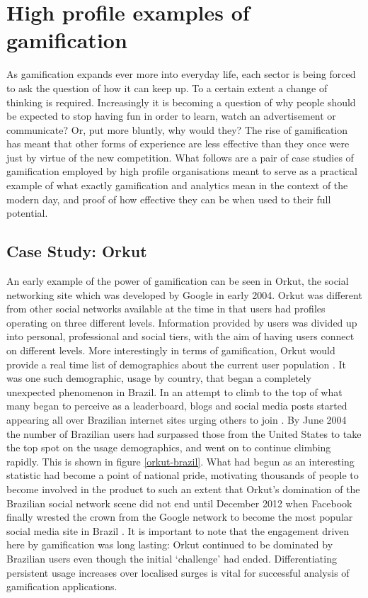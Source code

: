 \documentclass[12pt,a4paper,twoside]{report}
\begin{document}
\section{High profile examples of gamification}
As gamification expands ever more into everyday life, each sector is being forced to ask the question of how it can keep up. To a certain extent a change of thinking is required. Increasingly it is becoming a question of why people should be expected to stop having fun in order to learn, watch an advertisement or communicate? \cite{zichermann2010game} Or, put more bluntly, why would they? The rise of gamification has meant that other forms of experience are less effective than they once were just by virtue of the new competition. What follows are a pair of case studies of gamification employed by high profile organisations meant to serve as a practical example of what exactly gamification and analytics mean in the context of the modern day, and proof of how effective they can be when used to their full potential.

\subsection{Case Study: Orkut}

An early example of the power of gamification can be seen in Orkut, the social networking site which was developed by Google in early 2004. Orkut was different from other social networks available at the time in that users had profiles operating on three different levels. Information provided by users was divided up into personal, professional and social tiers, with the aim of having users connect on different levels. More interestingly in terms of gamification, Orkut would provide a real time list of demographics about the current user population \cite{fragoso2006wtf}. It was one such demographic, usage by country, that began a completely unexpected phenomenon in Brazil. In an attempt to climb to the top of what many began to perceive as a leaderboard, blogs and social media posts started appearing all over Brazilian internet sites urging others to join \cite{zichermann2010game}. By June 2004 the number of Brazilian users had surpassed those from the United States to take the top spot on the usage demographics, and went on to continue climbing rapidly. This is shown in figure \ref{orkut-brazil}. What had begun as an interesting statistic had become a point of national pride, motivating thousands of people to become involved in the product to such an extent that Orkut's domination of the Brazilian social network scene did not end until December 2012 when Facebook finally wrested the crown from the Google network to become the most popular social media site in Brazil \cite{1_comscore_2012}. It is important to note that the engagement driven here by gamification was long lasting: Orkut continued to be dominated by Brazilian users even though the initial `challenge' had ended. Differentiating persistent usage increases over localised surges is vital for successful analysis of gamification applications.
\end{document}
